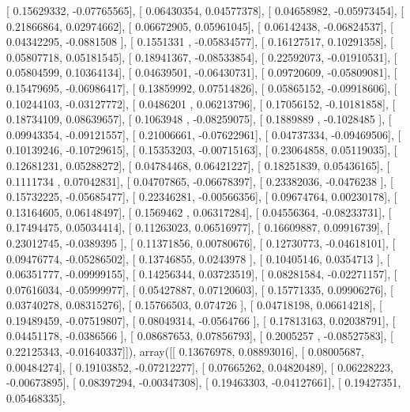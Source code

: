 \documentclass{article}
\begin{document}
       [ 0.15629332, -0.07765565],
       [ 0.06430354,  0.04577378],
       [ 0.04658982, -0.05973454],
       [ 0.21866864,  0.02974662],
       [ 0.06672905,  0.05961045],
       [ 0.06142438, -0.06824537],
       [ 0.04342295, -0.0881508 ],
       [ 0.1551331 , -0.05834577],
       [ 0.16127517,  0.10291358],
       [ 0.05807718,  0.05181545],
       [ 0.18941367, -0.08533854],
       [ 0.22592073, -0.01910531],
       [ 0.05804599,  0.10364134],
       [ 0.04639501, -0.06430731],
       [ 0.09720609, -0.05809081],
       [ 0.15479695, -0.06986417],
       [ 0.13859992,  0.07514826],
       [ 0.05865152, -0.09918606],
       [ 0.10244103, -0.03127772],
       [ 0.0486201 ,  0.06213796],
       [ 0.17056152, -0.10181858],
       [ 0.18734109,  0.08639657],
       [ 0.1063948 , -0.08259075],
       [ 0.1889889 , -0.1028485 ],
       [ 0.09943354, -0.09121557],
       [ 0.21006661, -0.07622961],
       [ 0.04737334, -0.09469506],
       [ 0.10139246, -0.10729615],
       [ 0.15353203, -0.00715163],
       [ 0.23064858,  0.05119035],
       [ 0.12681231,  0.05288272],
       [ 0.04784468,  0.06421227],
       [ 0.18251839,  0.05436165],
       [ 0.1111734 ,  0.07042831],
       [ 0.04707865, -0.06678397],
       [ 0.23382036, -0.0476238 ],
       [ 0.15732225, -0.05685477],
       [ 0.22346281, -0.00566356],
       [ 0.09674764,  0.00230178],
       [ 0.13164605,  0.06148497],
       [ 0.1569462 ,  0.06317284],
       [ 0.04556364, -0.08233731],
       [ 0.17494475,  0.05034414],
       [ 0.11263023,  0.06516977],
       [ 0.16609887,  0.09916739],
       [ 0.23012745, -0.0389395 ],
       [ 0.11371856,  0.00780676],
       [ 0.12730773, -0.04618101],
       [ 0.09476774, -0.05286502],
       [ 0.13746855,  0.0243978 ],
       [ 0.10405146,  0.0354713 ],
       [ 0.06351777, -0.09999155],
       [ 0.14256344,  0.03723519],
       [ 0.08281584, -0.02271157],
       [ 0.07616034, -0.05999977],
       [ 0.05427887,  0.07120603],
       [ 0.15771335,  0.09906276],
       [ 0.03740278,  0.08315276],
       [ 0.15766503,  0.074726  ],
       [ 0.04718198,  0.06614218],
       [ 0.19489459, -0.07519807],
       [ 0.08049314, -0.0564766 ],
       [ 0.17813163,  0.02038791],
       [ 0.04451178, -0.0386566 ],
       [ 0.08687653,  0.07856793],
       [ 0.2005257 , -0.08527583],
       [ 0.22125343, -0.01640337]]), array([[ 0.13676978,  0.08893016],
       [ 0.08005687,  0.00484274],
       [ 0.19103852, -0.07212277],
       [ 0.07665262,  0.04820489],
       [ 0.06228223, -0.00673895],
       [ 0.08397294, -0.00347308],
       [ 0.19463303, -0.04127661],
       [ 0.19427351,  0.05468335],
\end{document}

